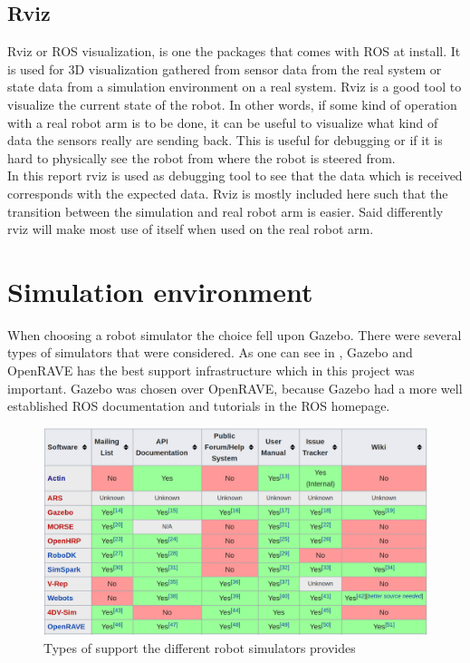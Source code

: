 \subsection{Rviz}
Rviz or ROS visualization, is one the packages that comes with ROS at install. It is used for 3D visualization gathered from sensor data from the real system or state data from a simulation environment on a real system. Rviz is a good tool to visualize the current state of the robot. In other words, if some kind of operation with a real robot arm is to be done, it can be useful to visualize what kind of data the sensors really are sending back. This is useful for debugging or if it is hard to physically see the robot from where the robot is steered from.\\
In this report rviz is used as debugging tool to see that the data which is received corresponds with the expected data. Rviz is mostly included here such that the transition between the simulation and real robot arm is easier. Said differently rviz will make most use of itself when used on the real robot arm\cite{ROSWiki}. 

\section{Simulation environment}
When choosing a robot simulator the choice fell upon Gazebo. There were several types of simulators that were considered. As one can see in , Gazebo and OpenRAVE has the best support infrastructure which in this project was important\cite{wikiRobSim}. Gazebo was chosen over OpenRAVE, because Gazebo had a more well established ROS documentation and tutorials in the ROS homepage\cite{ROS}.
\begin{figure}[bpth]
  \centering
  \includegraphics[width=.9\textwidth]{img/WikipTableRobSim.png}
  \caption[Types of support the different robot simulators provides]{Types of support the different robot simulators provides\cite{wikiRobSim}}
  \label{fig:infra}
\end{figure}

